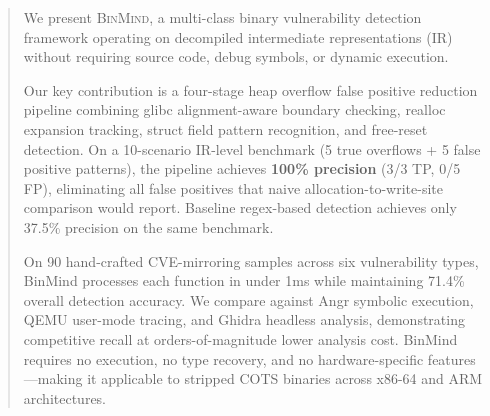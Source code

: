 \begin{abstract}
We present \textsc{BinMind}, a multi-class binary vulnerability detection framework
operating on decompiled intermediate representations (IR) without requiring source
code, debug symbols, or dynamic execution. 

Our key contribution is a four-stage heap overflow false positive reduction pipeline
combining glibc alignment-aware boundary checking, realloc expansion tracking, struct
field pattern recognition, and free-reset detection. On a 10-scenario IR-level
benchmark (5 true overflows + 5 false positive patterns), the pipeline achieves
\textbf{100\% precision} (3/3 TP, 0/5 FP), eliminating all false positives that
naive allocation-to-write-site comparison would report. Baseline regex-based detection
achieves only 37.5\% precision on the same benchmark.

On 90 hand-crafted CVE-mirroring samples across six vulnerability types, BinMind
processes each function in under 1ms while maintaining 71.4\% overall detection
accuracy. We compare against Angr symbolic execution, QEMU user-mode tracing, and
Ghidra headless analysis, demonstrating competitive recall at orders-of-magnitude
lower analysis cost. BinMind requires no execution, no type recovery, and no
hardware-specific features---making it applicable to stripped COTS binaries across
x86-64 and ARM architectures.
\end{abstract}
